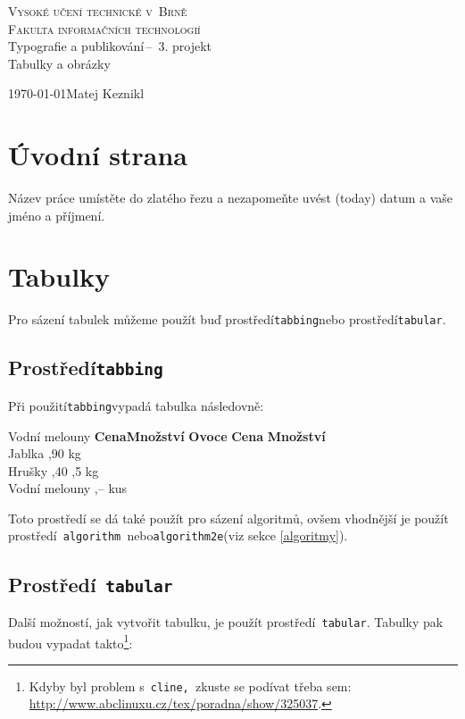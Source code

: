 \documentclass[a4paper, 11pt]{article}
\begin{document}
\begin{titlepage}
	\begin{center} 
		\textsc{\Huge Vysoké učení technické v~Brně\\
			\huge Fakulta informačních technologií \\}
			\LARGE Typografie a publikování\,--\ 3. projekt\\
			\Huge Tabulky a obrázky
			\end{center}
			\Large \today \hfill Matej Keznikl
			\end{titlepage}
									
			\section{Úvodní strana}
			Název práce umístěte do zlatého řezu a nezapomeňte uvést  (today) datum a vaše jméno a příjmení.
									
			\section{Tabulky}
			Pro sázení tabulek můžeme použít buď prostředí\texttt{tabbing}nebo prostředí\texttt{tabular}.
									
			\subsection{Prostředí\texttt{tabbing}}
			Při použití\texttt{tabbing}vypadá tabulka následovně:
									
			\begin{tabbing}
				Vodní melouny \quad  \=\textbf{Cena}\quad   \=\textbf{Množství}\kill
				\textbf{Ovoce}  \>\textbf{Cena} \>\textbf{Množství}\\
				Jablka          ,90         kg\\
				Hrušky          ,40        ,5 kg\\
				Vodní melouny   ,--         kus\\
			\end{tabbing}
			Toto prostředí se dá také použít pro sázení algoritmů, ovšem vhodnější je použít prostředí\texttt{ algorithm }nebo\texttt{algorithm2e}(viz sekce \ref{algoritmy}).
									
			\subsection{Prostředí\texttt{ tabular}}
			Další možností, jak vytvořit tabulku, je použít prostředí\texttt{ tabular}. Tabulky pak budou vypadat takto\footnote{Kdyby byl problem s\texttt{ cline, }zkuste se podívat třeba sem: \href{http://www.abclinuxu.cz/tex/poradna/show/325037}{http://www.abclinuxu.cz/tex/poradna/show/325037}.}:
									
\end{document}
